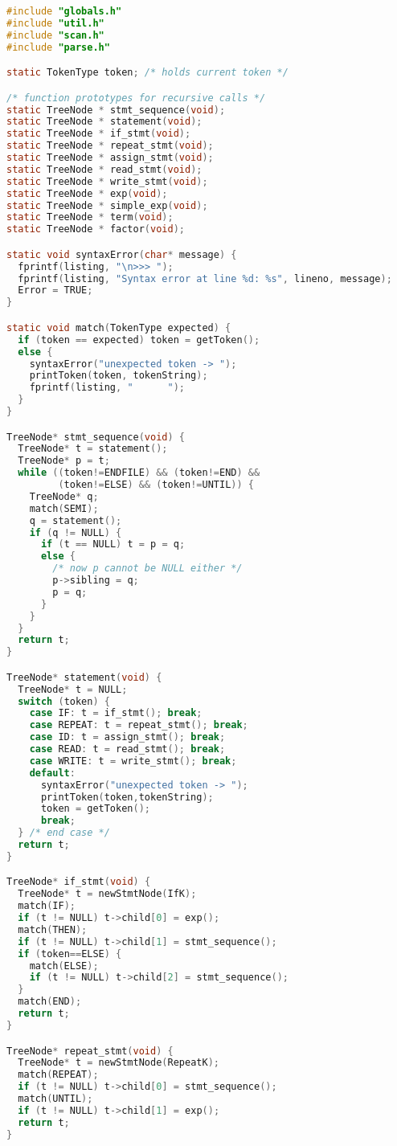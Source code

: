 \documentclass[lang=cn,10pt]{elegantbook}
\begin{document}
\begin{lstlisting}[caption={parse.c},language=c]
#include "globals.h"
#include "util.h"
#include "scan.h"
#include "parse.h"

static TokenType token; /* holds current token */

/* function prototypes for recursive calls */
static TreeNode * stmt_sequence(void);
static TreeNode * statement(void);
static TreeNode * if_stmt(void);
static TreeNode * repeat_stmt(void);
static TreeNode * assign_stmt(void);
static TreeNode * read_stmt(void);
static TreeNode * write_stmt(void);
static TreeNode * exp(void);
static TreeNode * simple_exp(void);
static TreeNode * term(void);
static TreeNode * factor(void);

static void syntaxError(char* message) {
  fprintf(listing, "\n>>> ");
  fprintf(listing, "Syntax error at line %d: %s", lineno, message);
  Error = TRUE;
}

static void match(TokenType expected) {
  if (token == expected) token = getToken();
  else {
    syntaxError("unexpected token -> ");
    printToken(token, tokenString);
    fprintf(listing, "      ");
  }
}

TreeNode* stmt_sequence(void) {
  TreeNode* t = statement();
  TreeNode* p = t;
  while ((token!=ENDFILE) && (token!=END) &&
         (token!=ELSE) && (token!=UNTIL)) {
    TreeNode* q;
    match(SEMI);
    q = statement();
    if (q != NULL) {
      if (t == NULL) t = p = q;
      else {
        /* now p cannot be NULL either */
        p->sibling = q;
        p = q;
      }
    }
  }
  return t;
}

TreeNode* statement(void) {
  TreeNode* t = NULL;
  switch (token) {
    case IF: t = if_stmt(); break;
    case REPEAT: t = repeat_stmt(); break;
    case ID: t = assign_stmt(); break;
    case READ: t = read_stmt(); break;
    case WRITE: t = write_stmt(); break;
    default:
      syntaxError("unexpected token -> ");
      printToken(token,tokenString);
      token = getToken();
      break;
  } /* end case */
  return t;
}

TreeNode* if_stmt(void) {
  TreeNode* t = newStmtNode(IfK);
  match(IF);
  if (t != NULL) t->child[0] = exp();
  match(THEN);
  if (t != NULL) t->child[1] = stmt_sequence();
  if (token==ELSE) {
    match(ELSE);
    if (t != NULL) t->child[2] = stmt_sequence();
  }
  match(END);
  return t;
}

TreeNode* repeat_stmt(void) {
  TreeNode* t = newStmtNode(RepeatK);
  match(REPEAT);
  if (t != NULL) t->child[0] = stmt_sequence();
  match(UNTIL);
  if (t != NULL) t->child[1] = exp();
  return t;
}


\end{lstlisting}
\end{document}
